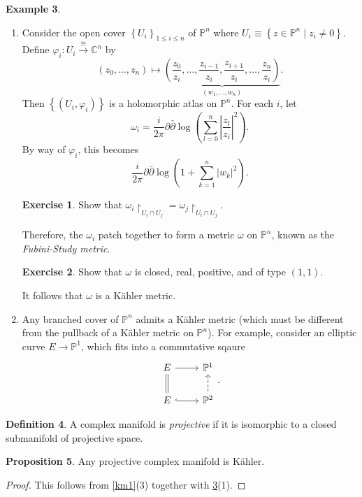 \documentclass[10pt,letterpaper,cm]{nupset}
\theoremstyle{definition}
\newtheorem{defn}{Definition}[subsection]
\newtheorem{exmp}[defn]{Example}
\theoremstyle{theorem}
\newtheorem{prop}[defn]{Proposition}
\newtheorem{exercise}[defn]{Exercise}
\theoremstyle{remark}
\newcommand{\C}{\mathbb C}
\renewcommand{\P}{\mathbb P}
\newcommand{\1}{\mathbb{1}}
\newcommand{\0}{\vec 0}
\newcommand{\be}{\begin{enumerate}}
\newcommand{\ee}{\end{enumerate}}
\begin{document}
\begin{exmp}\label{km2} $ $
\be
\item  Consider the open cover $\left\{U_i\right\}_{1\leq i \leq n}$ of $\P^n$ where $U_i \equiv \left\{z \in \P^n \mid z_i \ne 0\right\}$. Define $\varphi_i : U_i \overset{\cong}{\longrightarrow} \C^n$ by $$\left(z_0, \ldots, z_n\right) \mapsto \underbrace{\left(\frac{z_0}{z_i}, \ldots, \frac{z_{i-1}}{z_i}, \frac{z_{i+1}}{z_i}, \ldots, \frac{z_n}{z_i}\right)}_{\left(w_1, \ldots, w_n\right)}. $$ Then $\left\{\left(U_i, \varphi_i\right)\right\}$ is a holomorphic atlas on $\P^n$. For each $i$, let 
\[
\omega_i =  \frac{i}{2\pi}{\partial{\bar{\partial}}\log\left(\sum_{l=0}^n \left\lvert{\frac{z_l}{z_i}}\right\rvert^2\right)}
.\] By way of $\varphi_i$, this becomes
\[
\frac{i}{2\pi}{\partial{\bar{\partial}}\log\left(1+ \sum_{k=1}^n \left\lvert{w_k}\right\rvert^2\right)}
.\]
\begin{exercise}
 Show that $\omega_i\restriction_{U_i \cap U_j} = \omega_j\restriction_{U_i \cap U_j}$.
\end{exercise}
Therefore, the $\omega_i$ patch together to form a metric $\omega$ on $\P^n$, known as the \textit{Fubini-Study metric}. 
\begin{exercise}
Show that $\omega$ is closed, real, positive, and of type $\left(1,1\right)$.
\end{exercise}
It follows that $\omega$ is a K\"ahler metric.

\item  Any branched cover of $\P^n$ admits a K\"ahler metric (which must be different from the pullback of a K\"ahler metric on $\P^n$). For example, consider an elliptic curve $E \to \P^1$, which fits into a commutative sqaure
\[
\begin{tikzcd}
E \arrow[d, equals] \arrow[r] & \P^1                   \\
E \arrow[r, hook]     & \P^2 \arrow[u, dashed]
\end{tikzcd}
.\]
\ee
\end{exmp}

\begin{defn}
A complex manifold is \textit{projective} if it is isomorphic to a closed submanifold of projective space.
\end{defn}

\begin{prop}
Any projective complex manifold is K\"ahler.
\end{prop}
\begin{proof}
This follows from \cref{km1}(3) together with \cref{km2}(1).
\end{proof}
\end{document}
